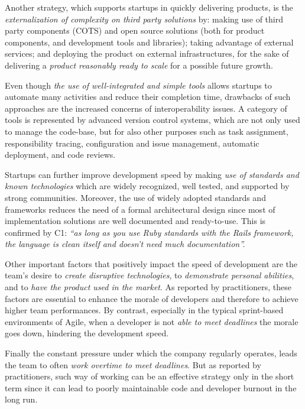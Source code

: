 \documentclass[10pt,journal,letterpaper,compsoc]{IEEEtran}
\begin{document}
Another strategy, which supports startups in quickly delivering products, is
the \textit{externalization of complexity on third party solutions} by: making
use of third party components (COTS) and open source solutions (both for
product components, and development tools and libraries); taking advantage of
external services; and deploying the product on external infrastructures, for
the sake of delivering a \textit{product reasonably ready to scale} for a
possible future growth.

Even though \textit{the use of well-integrated and simple tools} allows
startups to automate many activities and reduce their completion time, drawbacks
of such approaches are the increased concerns of interoperability issues. A
category of tools is represented by advanced version control systems, which are
not only used to manage the code-base, but for also other purposes such as
task assignment, responsibility tracing, configuration and issue 
management, automatic deployment, and code reviews.

Startups can further improve development speed by making \textit{use of
standards and known technologies} which are widely recognized, well tested, and
supported by strong communities. Moreover, the use of widely adopted standards
and frameworks reduces the need of a formal architectural design since most of
implementation solutions are well documented and ready-to-use. This is confirmed
by C1: \textit{``as long as you use Ruby standards with the Rails framework, the
language is clean itself and doesn't need much documentation''.}

Other important factors that positively impact the speed of development are the
team's desire to \textit{create disruptive technologies}, to
\textit{demonstrate personal abilities}, and to \textit{have the product used in
the market}. As reported by practitioners, these factors are essential to
enhance the morale of developers and therefore to achieve higher team
performances. By contrast, especially in the typical sprint-based environments
of Agile, when a developer is not \textit{able to meet deadlines} the morale
goes down, hindering the development speed.

Finally the constant pressure under which the company regularly operates, leads
the team to often \textit{work overtime to meet deadlines}. But as reported by
practitioners, such way of working can be an effective strategy only in the
short term since it can lead to poorly maintainable code and developer burnout
in the long run.
\end{document}
